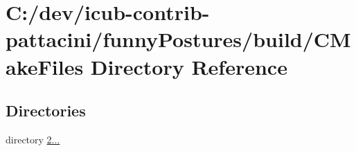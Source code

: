 \section{C\+:/dev/icub-\/contrib-\/pattacini/funny\+Postures/build/\+C\+Make\+Files Directory Reference}
\label{dir_e149582ee98e04bdae7b6393a1884d08}
\subsection*{Directories}
\begin{DoxyCompactItemize}
\item 
directory \hyperlink{dir_7e53b351c275d2c3d69b5ba8e817c448}{2...}
\end{DoxyCompactItemize}
